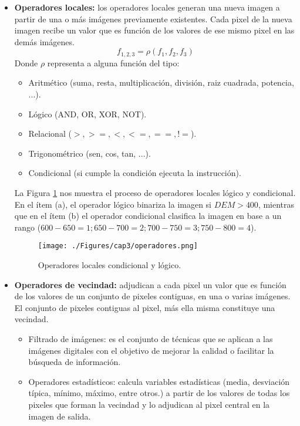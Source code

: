 	\begin{itemize}
		\item \textbf{Operadores locales:} los operadores locales generan una nueva imagen a partir de una o m\'as im\'agenes previamente existentes. Cada pixel de la nueva imagen recibe un valor que es funci\'on de los valores de ese mismo pixel en las dem\'as im\'agenes.
		\begin{equation}
		\label{e:opLoc}
		f_{1,2,3}=\rho(f_{1},f_{2},f_{3})
		\end{equation}
		Donde $ \rho $ representa a alguna funci\'on del tipo:
		\begin{itemize}
			\item Aritm\'etico (suma, resta, multiplicaci\'on, divisi\'on, raiz cuadrada, potencia, ...).
			\item L\'ogico (AND, OR, XOR, NOT).
			\item Relacional ($ >, >=, <, <=, ==, != $).
			\item Trigonom\'etrico (sen, cos, tan, ...).
			\item Condicional (si cumple la condición ejecuta la instrucción).
		\end{itemize}
		La Figura \ref{fig:oploccond} nos muestra el proceso de operadores locales l\'ogico y condicional. En el \'item (a), el operador l\'ogico binariza la imagen si $ DEM > 400 $, mientras que en el \'item (b) el operador condicional clasifica la imagen en base a un rango ($ 600 - 650 = 1; 650 - 700 = 2; 700 - 750 = 3; 750 - 800 = 4 $).
		  \begin{figure}[H]
		  	\centering
		  	\texttt{[image: ./Figures/cap3/operadores.png]}
		  	\caption{Operadores locales condicional y l\'ogico.}
		  	\label{fig:oploccond}
		  \end{figure}
		\item  \textbf{Operadores de vecindad:} adjudican a cada pixel un valor que es funci\'on de los valores de un conjunto de pixeles contiguas, en una o varias im\'agenes. El conjunto de pixeles contiguas al pixel, m\'as ella misma constituye una vecindad.
		\begin{itemize}
			\item Filtrado de im\'agenes: es el conjunto de t\'ecnicas que se aplican a las im\'agenes digitales con el objetivo de mejorar la calidad o facilitar la b\'usqueda de informaci\'on.
			\item Operadores estad\'isticos: calcula variables estad\'isticas (media, desviaci\'on t\'ipica, m\'inimo, m\'aximo, entre otros.) a partir de los valores de todas los pixeles que forman la vecindad y lo adjudican al pixel central en la imagen de salida. 

\end{itemize}
\end{itemize}
